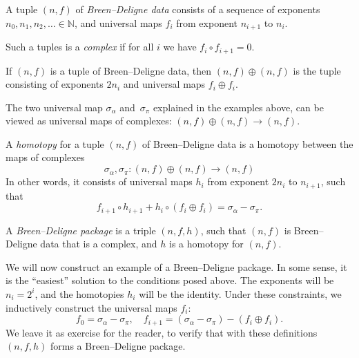 \begin{definition}
  \label{BD_data}
  \leanok
  A tuple $(n, f)$ of \emph{Breen--Deligne data}
  consists of a sequence of exponents $n_0, n_1, n_2, \dots \in \mathbb N$,
  and universal maps $f_i$ from exponent $n_{i+1}$ to $n_i$.

  Such a tuples is a \emph{complex} if for all $i$ we have $f_i \circ f_{i+1} = 0$.
\end{definition}

\begin{definition}
  \label{BD_data_double}
  If $(n, f)$ is a tuple of Breen--Deligne data,
  then $(n, f) \oplus (n, f)$ is the tuple
  consisting of exponents $2n_i$ and universal maps $f_i \oplus f_i$.
\end{definition}

The two universal map $\sigma_\alpha$ and~$\sigma_\pi$ explained in the examples above,
can be viewed as universal maps of complexes: $(n,f) \oplus (n,f) \to (n,f)$.

\begin{definition}
  \label{BD_homotopy}
  \leanok
  A \emph{homotopy} for a tuple $(n, f)$ of Breen--Deligne data
  is a homotopy between the maps of complexes
  \[
    \sigma_\alpha, \sigma_\pi \colon (n,f) \oplus (n,f) \to (n,f)
  \]
  In other words, it consists of universal maps $h_i$ from exponent $2n_i$ to $n_{i+1}$,
  such that
  \[
    f_{i+1} \circ h_{i+1} + h_i \circ (f_i \oplus f_i) = \sigma_\alpha - \sigma_\pi.
  \]
\end{definition}

\begin{definition}
  \label{BD_package}
  \leanok
  A \emph{Breen--Deligne package}
  is a triple $(n, f, h)$,
  such that $(n, f)$ is Breen--Deligne data that is a complex,
  and $h$ is a homotopy for $(n,f)$.
\end{definition}

\begin{definition}
  \label{BD_eg}
  \leanok
  We will now construct an example of a Breen--Deligne package.
  In some sense, it is the ``easiest'' solution to the conditions posed above.
  The exponents will be $n_i = 2^i$, and the homotopies $h_i$ will be the identity.
  Under these constraints, we inductively construct the universal maps $f_i$:
  \[
    f_0 = \sigma_\alpha - \sigma_\pi,
    \quad
    f_{i+1} = (\sigma_\alpha - \sigma_\pi) - (f_i \oplus f_i).
  \]
  We leave it as exercise for the reader, to verify that
  with these definitions $(n, f, h)$ forms a Breen--Deligne package.
\end{definition}

